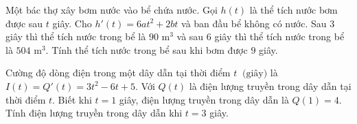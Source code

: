 \begin{bt}%
	Một bác thợ xây bơm nước vào bể chứa nước. Gọi $h(t)$ là thể tích nước bơm được sau $t$ giây. Cho $h'(t)=6at^2+2bt$ và ban đầu bể không có nước. Sau $3$ giây thì thể tích nước trong bể là $90$ m$^3$ và sau 6 giây thì thể tích nước trong bể là $504$ m$^3$. Tính thể tích nước trong bể sau khi bơm được $9$  giây.
\end{bt}

\begin{bt}%
	Cường độ dòng điện trong một dây dẫn tại thời điểm $t~\text{ (giây)}$ là $I(t)=Q'(t)=3t^2-6t+5$. Với $Q(t)$ là  điện lượng truyền trong dây dẫn tại thời điểm $t$. Biết khi $t=1$ giây, điện lượng truyền trong dây dẫn là $Q(1)=4$. Tính điện lượng truyền trong dây dẫn khi $t=3$ giây.
\end{bt}

